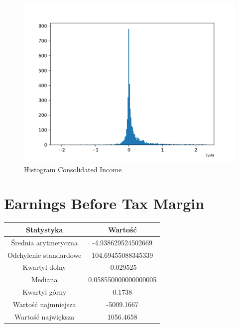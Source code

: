 \documentclass{article}
\begin{document}
\begin{figure}[h!]
    \includegraphics[width=\linewidth]{variables/Consolidated Income.png}
    \caption{Histogram Consolidated Income }
\end{figure}\section{ Earnings Before Tax Margin }

\begin{center}
    \begin{tabular}{|c | c|} 
    \hline
    Statystyka & Wartość \\
    \hline\hline
    Średnia arytmetyczna & -4.938629524502669 \\ 
    \hline
    Odchylenie standardowe & 104.69455088345339 \\
    \hline
    Kwartyl dolny & -0.029525 \\
    \hline
    Mediana & 0.058550000000000005 \\
    \hline
    Kwartyl górny & 0.1738 \\
    \hline
    Wartość najmniejsza & -5009.1667 \\
    \hline
    Wartość największa & 1056.4658 \\
    \hline
   \end{tabular}
\end{center}
\end{document}
